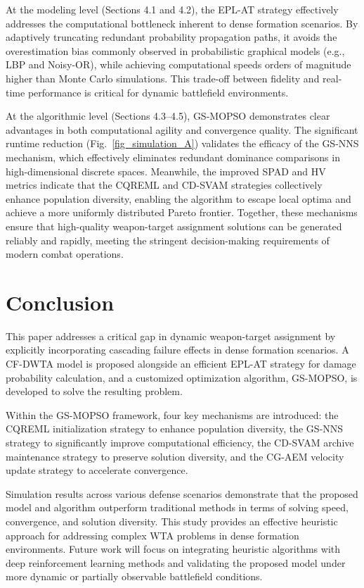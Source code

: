 \documentclass[lettersize,journal]{IEEEtran}
\begin{document}
At the modeling level (Sections 4.1 and 4.2), the EPL-AT strategy effectively addresses the computational bottleneck inherent to dense formation scenarios. By adaptively truncating redundant probability propagation paths, it avoids the overestimation bias commonly observed in probabilistic graphical models (e.g., LBP and Noisy-OR), while achieving computational speeds orders of magnitude higher than Monte Carlo simulations. This trade-off between fidelity and real-time performance is critical for dynamic battlefield environments.

At the algorithmic level (Sections 4.3–4.5), GS-MOPSO demonstrates clear advantages in both computational agility and convergence quality. The significant runtime reduction (Fig.~\ref{fig_simulation_A}) validates the efficacy of the GS-NNS mechanism, which effectively eliminates redundant dominance comparisons in high-dimensional discrete spaces. Meanwhile, the improved SPAD and HV metrics indicate that the CQREML and CD-SVAM strategies collectively enhance population diversity, enabling the algorithm to escape local optima and achieve a more uniformly distributed Pareto frontier. Together, these mechanisms ensure that high-quality weapon-target assignment solutions can be generated reliably and rapidly, meeting the stringent decision-making requirements of modern combat operations.

\section{Conclusion}
This paper addresses a critical gap in dynamic weapon-target assignment by explicitly incorporating cascading failure effects in dense formation scenarios. A CF-DWTA model is proposed alongside an efficient EPL-AT strategy for damage probability calculation, and a customized optimization algorithm, GS-MOPSO, is developed to solve the resulting problem.

Within the GS-MOPSO framework, four key mechanisms are introduced: the CQREML initialization strategy to enhance population diversity, the GS-NNS strategy to significantly improve computational efficiency, the CD-SVAM archive maintenance strategy to preserve solution diversity, and the CG-AEM velocity update strategy to accelerate convergence.

Simulation results across various defense scenarios demonstrate that the proposed model and algorithm outperform traditional methods in terms of solving speed, convergence, and solution diversity. This study provides an effective heuristic approach for addressing complex WTA problems in dense formation environments. Future work will focus on integrating heuristic algorithms with deep reinforcement learning methods and validating the proposed model under more dynamic or partially observable battlefield conditions.


 
         
\end{document}
